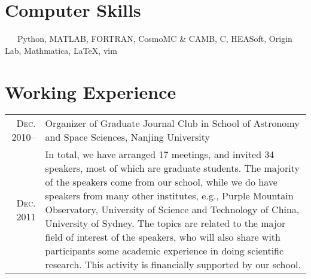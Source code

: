 \documentclass[10pt]{article}
\begin{document}
\section{Computer Skills}
~~~Python, MATLAB, FORTRAN, CosmoMC \& CAMB, C, HEASoft, Origin Lab, Mathmatica, \LaTeX, vim

\section{Working Experience}
\begin{tabular}{rp{16cm}}
\textsc{Dec. 2010}--  & Organizer of Graduate Journal Club in School of Astronomy and Space Sciences, Nanjing University \\
\textsc{Dec. 2011}    & \small{In total, we have arranged 17 meetings, and invited 34 speakers, most of which are graduate students. The majority of the speakers come from our school, while we do have speakers from many other institutes, e.g., Purple Mountain Observatory, University of Science and Technology of China, University of Sydney. The topics are related to the major field of interest of the speakers, who will also share with participants some academic experience in doing scientific research. This activity is financially supported by our school.}  \\

\end{tabular}
\end{document}
